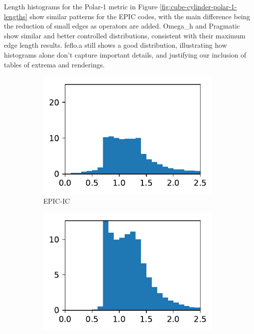 \documentclass[3p,times,procedia,number]{elsarticle}
\begin{document}
Length histograms for the Polar-1 metric in Figure \ref{fig:cube-cylinder-polar-1-lengths}
show similar patterns for the EPIC codes, with the main difference being the
reduction of small edges as operators are added.
Omega\_h and Pragmatic show similar and better controlled distributions, consistent
with their maximum edge length results.
feflo.a still shows a good distribution, illustrating how histograms alone
don't capture important details, and justifying our inclusion of tables of extrema
and renderings.
\begin{figure}
\begin{subfigure}{.16\textwidth}
\centering
\includegraphics[width=\textwidth]{epic-ic-cube-cylinder-polar-1-length.pdf}
\caption{EPIC-IC}
\end{subfigure}
\begin{subfigure}{.16\textwidth}
\centering
\includegraphics[width=\textwidth]{epic-ics-cube-cylinder-polar-1-length.pdf}

\end{subfigure}
\end{figure}
\end{document}
